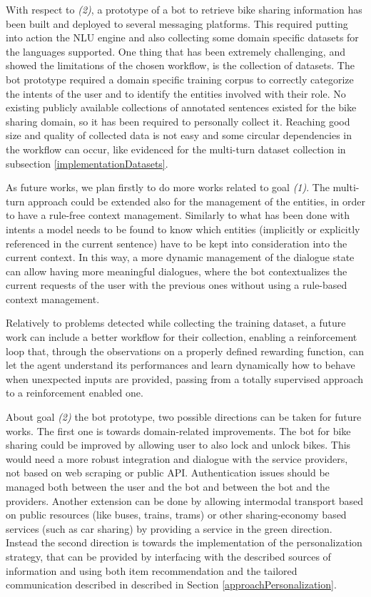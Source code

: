 With respect to \textit{(2)}, a prototype of a bot to retrieve bike sharing information has been built and deployed to several messaging platforms. This required putting into action the NLU engine and also collecting some domain specific datasets for the languages supported. One thing that has been extremely challenging, and showed the limitations of the chosen workflow, is the collection of datasets. The bot prototype required a domain specific training corpus to correctly categorize the intents of the user and to identify the entities involved with their role. No existing publicly available collections of annotated sentences existed for the bike sharing domain, so it has been required to personally collect it. Reaching good size and quality of collected data is not easy and some circular dependencies in the workflow can occur, like evidenced for the multi-turn dataset collection in subsection \ref{implementationDatasets}.

As future works, we plan firstly to do more works related to goal \textit{(1)}. The multi-turn approach could be extended also for the management of the entities, in order to have a rule-free context management. Similarly to what has been done with intents a model needs to be found to know which entities (implicitly or explicitly referenced in the current sentence) have to be kept into consideration into the current context. In this way, a more dynamic management of the dialogue state can allow having more meaningful dialogues, where the bot contextualizes the current requests of the user with the previous ones without using a rule-based context management.

Relatively to problems detected while collecting the training dataset, a future work can include a better workflow for their collection, enabling a reinforcement loop that, through the observations on a properly defined rewarding function, can let the agent understand its performances and learn dynamically how to behave when unexpected inputs are provided, passing from a totally supervised approach to a reinforcement enabled one.

About  goal \textit{(2)} the bot prototype, two possible directions can be taken for future works. The first one is towards domain-related improvements. The bot for bike sharing could be improved by allowing user to also lock and unlock bikes. This would need a more robust integration and dialogue with the service providers, not based on web scraping or public API. Authentication issues should be managed both between the user and the bot and between the bot and the providers. Another extension can be done by allowing intermodal transport based on public resources (like buses, trains, trams) or other sharing-economy based services (such as car sharing) by providing a service in the green direction. Instead the second direction is towards the implementation of the personalization strategy, that can be provided by interfacing with the described sources of information and using both item recommendation and the tailored communication described in described in Section \ref{approachPersonalization}.

